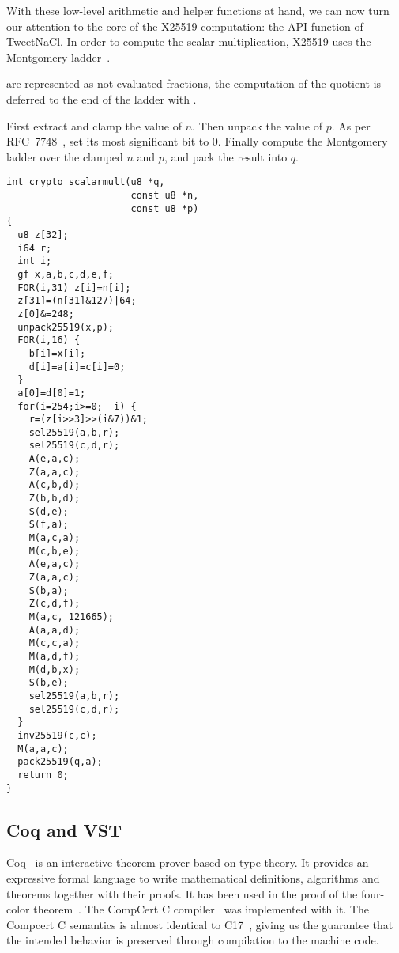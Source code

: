 With these low-level arithmetic and helper functions at hand, we can now
turn our attention to the core of the X25519 computation:
the  API function of TweetNaCl.
In order to compute the scalar multiplication,
X25519 uses the Montgomery ladder~\cite{Mon85}.

\xcoords are represented as not-evaluated fractions, the computation of
the quotient is deferred to the end of the ladder with .

First extract and clamp the value of $n$. Then unpack the value of $p$.
As per RFC~7748~\cite{rfc7748}, set its most significant bit to 0.
Finally compute the Montgomery ladder over the clamped $n$ and $p$,
and pack the result into $q$.
\begin{lstlisting}[language=Ctweetnacl]
int crypto_scalarmult(u8 *q,
                      const u8 *n,
                      const u8 *p)
{
  u8 z[32];
  i64 r;
  int i;
  gf x,a,b,c,d,e,f;
  FOR(i,31) z[i]=n[i];
  z[31]=(n[31]&127)|64;
  z[0]&=248;
  unpack25519(x,p);
  FOR(i,16) {
    b[i]=x[i];
    d[i]=a[i]=c[i]=0;
  }
  a[0]=d[0]=1;
  for(i=254;i>=0;--i) {
    r=(z[i>>3]>>(i&7))&1;
    sel25519(a,b,r);
    sel25519(c,d,r);
    A(e,a,c);
    Z(a,a,c);
    A(c,b,d);
    Z(b,b,d);
    S(d,e);
    S(f,a);
    M(a,c,a);
    M(c,b,e);
    A(e,a,c);
    Z(a,a,c);
    S(b,a);
    Z(c,d,f);
    M(a,c,_121665);
    A(a,a,d);
    M(c,c,a);
    M(a,d,f);
    M(d,b,x);
    S(b,e);
    sel25519(a,b,r);
    sel25519(c,d,r);
  }
  inv25519(c,c);
  M(a,a,c);
  pack25519(q,a);
  return 0;
}
\end{lstlisting}





\subsection{Coq and VST}
\label{subsec:Coq-VST}

Coq~\cite{coq-faq} is an interactive theorem prover based on type theory. It
provides an expressive formal language to write mathematical definitions,
algorithms and theorems together with their proofs. It has been used in the proof
of the four-color theorem~\cite{gonthier2008formal}.
The CompCert C compiler~\cite{Leroy-backend} was implemented with it.
The Compcert C semantics is almost identical to C17~\cite{ISO:C17}, giving us the
guarantee that the intended behavior is preserved through compilation to the
machine code.

